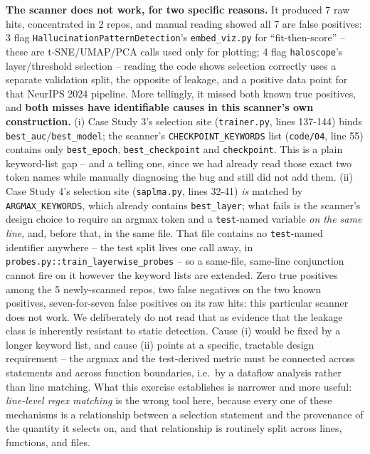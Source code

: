 \documentclass[10pt]{article} %
\begin{document}
\textbf{The scanner does not work, for two specific reasons.} It produced 7 raw
hits, concentrated in 2 repos, and manual reading showed all 7 are false
positives: 3 flag \texttt{HallucinationPatternDetection}'s
\texttt{embed\_viz.py} for ``fit-then-score'' -- these are t-SNE/UMAP/PCA calls
used only for plotting; 4 flag \texttt{haloscope}'s layer/threshold selection --
reading the code shows selection correctly uses a separate validation split,
the opposite of leakage, and a positive data point for that NeurIPS 2024
pipeline. More tellingly, it missed both known true positives, and \textbf{both
misses have identifiable causes in this scanner's own construction.} (i) Case
Study 3's selection site (\texttt{trainer.py}, lines 137-144) binds
\texttt{best\_auc}/\texttt{best\_model}; the scanner's
\texttt{CHECKPOINT\_KEYWORDS} list (\texttt{code/04}, line 55) contains only
\texttt{best\_epoch}, \texttt{best\_checkpoint} and \texttt{checkpoint}. This is
a plain keyword-list gap -- and a telling one, since we had already read those
exact two token names while manually diagnosing the bug and still did not add
them. (ii) Case Study 4's selection site (\texttt{saplma.py}, lines 32-41)
\emph{is} matched by \texttt{ARGMAX\_KEYWORDS}, which already contains
\texttt{best\_layer}; what fails is the scanner's design choice to require an
argmax token and a \texttt{test}-named variable \emph{on the same line}, and,
before that, in the same file. That file contains no \texttt{test}-named
identifier anywhere -- the test split lives one call away, in
\texttt{probes.py::train\_layerwise\_probes} -- so a same-file, same-line
conjunction cannot fire on it however the keyword lists are extended. Zero true
positives among the 5 newly-scanned repos, two false negatives on the two known
positives, seven-for-seven false positives on its raw hits: this particular
scanner does not work. We deliberately do not read that as evidence that the
leakage class is inherently resistant to static detection. Cause (i) would be
fixed by a longer keyword list, and cause (ii) points at a specific, tractable
design requirement -- the argmax and the test-derived metric must be connected
across statements and across function boundaries, i.e.\ by a dataflow analysis
rather than line matching. What this exercise establishes is narrower and more
useful: \emph{line-level regex matching} is the wrong tool here, because every
one of these mechanisms is a relationship between a selection statement and the
provenance of the quantity it selects on, and that relationship is routinely
split across lines, functions, and files.
\end{document}
